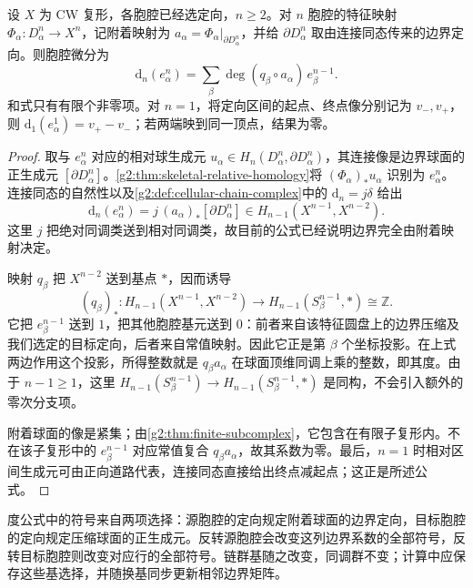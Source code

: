 \begin{theorem}\label{g2:thm:cellular-boundary-degree}
	设 \(X\) 为 CW 复形，各胞腔已经选定向，\(n\ge2\)。对 \(n\) 胞腔的特征映射 \(\Phi_\alpha:D^n_\alpha\rightarrow X^n\)，记附着映射为 \(a_\alpha=\Phi_\alpha|_{\partial D^n_\alpha}\)，并给 \(\partial D^n_\alpha\) 取由连接同态传来的边界定向。则胞腔微分为
	\begin{equation}\label{g2:eq:cellular-degree-formula}
		\mathrm{d}_n(e^n_\alpha)=\sum_\beta
		\deg(q_\beta\circ a_\alpha)\,e^{n-1}_\beta.
	\end{equation}
	和式只有有限个非零项。对 \(n=1\)，将定向区间的起点、终点像分别记为 \(v_-,v_+\)，则 \(\mathrm{d}_1(e^1_\alpha)=v_+-v_-\)；若两端映到同一顶点，结果为零。
\end{theorem}
\begin{proof}
	取与 \(e^n_\alpha\) 对应的相对球生成元 \(u_\alpha\in H_n(D^n_\alpha,\partial D^n_\alpha)\)，其连接像是边界球面的正生成元 \([\partial D^n_\alpha]\)。\cref{g2:thm:skeletal-relative-homology}将 \((\Phi_\alpha)_*u_\alpha\) 识别为 \(e^n_\alpha\)。连接同态的自然性以及\cref{g2:def:cellular-chain-complex}中的 \(\mathrm{d}_n=j\delta\) 给出
	\[
		\mathrm{d}_n(e^n_\alpha)
		=j\,(a_\alpha)_*[\partial D^n_\alpha]
		\in H_{n-1}(X^{n-1},X^{n-2}).
	\]
	这里 \(j\) 把绝对同调类送到相对同调类，故目前的公式已经说明边界完全由附着映射决定。

	映射 \(q_\beta\) 把 \(X^{n-2}\) 送到基点 \(*\)，因而诱导
	\[
		(q_\beta)_*:H_{n-1}(X^{n-1},X^{n-2})
		\longrightarrow H_{n-1}(S^{n-1}_\beta,*)\cong\mathbb Z.
	\]
	它把 \(e^{n-1}_\beta\) 送到 \(1\)，把其他胞腔基元送到 \(0\)：前者来自该特征圆盘上的边界压缩及我们选定的目标定向，后者来自常值映射。因此它正是第 \(\beta\) 个坐标投影。在上式两边作用这个投影，所得整数就是 \(q_\beta a_\alpha\) 在球面顶维同调上乘的整数，即其度。由于 \(n-1\ge1\)，这里 \(H_{n-1}(S^{n-1}_\beta)\rightarrow H_{n-1}(S^{n-1}_\beta,*)\) 是同构，不会引入额外的零次分支项。

	附着球面的像是紧集；由\cref{g2:thm:finite-subcomplex}，它包含在有限子复形内。不在该子复形中的 \(e^{n-1}_\beta\) 对应常值复合 \(q_\beta a_\alpha\)，故其系数为零。最后，\(n=1\) 时相对区间生成元可由正向道路代表，连接同态直接给出终点减起点；这正是所述公式。
\end{proof}

度公式中的符号来自两项选择：源胞腔的定向规定附着球面的边界定向，目标胞腔的定向规定压缩球面的正生成元。反转源胞腔会改变这列边界系数的全部符号，反转目标胞腔则改变对应行的全部符号。链群基随之改变，同调群不变；计算中应保存这些基选择，并随换基同步更新相邻边界矩阵。

